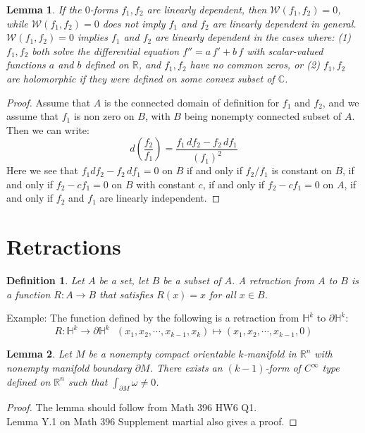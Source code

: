 \documentclass[11pt,oneside]{book}
\theoremstyle{break}
\theoremstyle{break}
\newtheorem{lem}{Lemma}[thm]
\newtheorem{defn}{Definition}[corL]
\newcommand{\R}{\mathbb{R}}
\newcommand{\Complex}{\mathbb{C}}
\newcommand{\example}{\color{green}Example: \color{black}}
\begin{document}
\begin{lem}
If the $0$-forms $f_1,f_2$ are linearly dependent, then $\mathcal{W}(f_1,f_2) = 0$, while $\mathcal{W}(f_1,f_2) = 0$ does not imply $f_1$ and $f_2$ are linearly dependent in general. $\mathcal{W}(f_1,f_2) = 0$ implies $f_1$ and $f_2$ are linearly dependent in the cases where: (1) $f_1,f_2$ both solve the differential equation $f'' = a\, f' + b\, f$ with scalar-valued functions $a$ and $b$ defined on $\R$, and $f_1,f_2$ have no common zeros, or (2) $f_1,f_2$ are holomorphic if they were defined on some convex subset of $\Complex$. 
\end{lem}
\begin{proof}
Assume that $A$ is the connected domain of definition for $f_1$ and $f_2$, and we assume that $f_1$ is non zero on $B$, with $B$ being nonempty connected subset of $A$. Then we can write:
$$d\left(\frac{f_2}{f_1}\right)=\frac{f_1\, df_2 - f_2 \, df_1}{(f_1)^2}$$
Here we see that ${f_1 df_2 - f_2 \, df_1} = 0$ on $B$ if and only if $f_2/f_1$ is constant on $B$, if and only if $f_2 -cf_1 = 0$ on $B$ with constant $c$, if and only if $f_2 - cf_1 = 0$ on $A$, if and only if $f_2$ and $f_1$ are linearly independent. 
\end{proof}

\newpage


\section[Retractions]{\color{red}Retractions\color{black}}
\begin{defn}
Let $A$ be a set, let $B$ be a subset of $A$. A retraction from $A$ to $B$ is a function $R:A \to B$ that satisfies $R(x) = x$ for all $x \in B$. 
\end{defn}

\example The function defined by the following is a retraction from $\mathbb{H}^k$ to $\partial \mathbb{H}^k$: 
$$R:\mathbb{H}^k \to \partial \mathbb{H}^k \ \ \ (x_1,x_2,\cdots, x_{k-1}, x_k) \mapsto (x_1,x_2,\cdots, x_{k-1}, 0)$$

\begin{lem}
Let $M$ be a nonempty compact orientable $k$-manifold in $\R^n$ with nonempty manifold boundary $\partial M$. There exists an $(k-1)$-form of $C^\infty$ type defined on $\R^n$ such that $\int_{\partial M}\omega \neq 0$. 
\end{lem}
\begin{proof}
The lemma should follow from Math 396 HW6 Q1. \\
Lemma Y.1 on Math 396 Supplement martial also gives a proof.
\end{proof}
\end{document}
